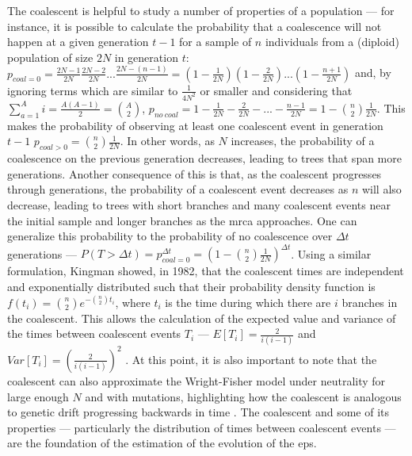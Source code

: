 The coalescent is helpful to study a number of properties of a population --- for instance, it is possible to calculate the probability that a coalescence will not happen at a given generation $t-1$ for a sample of $n$ individuals from a (diploid) population of size $2N$ in generation $t$: $p_{coal=0} = \frac{2N-1}{2N}\frac{2N-2}{2N}...\frac{2N-(n-1)}{2N} = (1 - \frac{1}{2N})(1 - \frac{2}{2N})...(1 - \frac{n+1}{2N})$ and, by ignoring terms which are similar to $\frac{1}{4N^2}$ or smaller and considering that $\sum^A_{a=1}{i} = \frac{A(A-1)}{2} = \binom{A}{2}$, $p_{no\ coal} = 1 - \frac{1}{2N} - \frac{2}{2N} -...- \frac{n-1}{2N} = 1 - \binom{n}{2}\frac{1}{2N}$. This makes the probability of observing at least one coalescent event in generation $t-1$ $p_{coal>0} = \binom{n}{2}\frac{1}{2N}$. In other words, as $N$ increases, the probability of a coalescence on the previous generation decreases, leading to trees that span more generations. Another consequence of this is that, as the coalescent progresses through generations, the probability of a coalescent event decreases as $n$ will also decrease, leading to trees with short branches and many coalescent events near the initial sample and longer branches as the \ac{mrca} approaches. One can generalize this probability to the probability of no coalescence over $\Delta t$ generations --- $P(T > \Delta t) = p_{coal=0}^{\Delta t} = (1-\binom{n}{2}\frac{1}{2N})^{\Delta t}$. Using a similar formulation, Kingman showed, in 1982, that the coalescent times are independent and exponentially distributed such that their probability density function is $f(t_i) = \binom{n}{2}e^{-\binom{n}{2}t_i}$, where $t_i$ is the time during which there are $i$ branches in the coalescent. This allows the calculation of the expected value and variance of the times between coalescent events $T_i$ --- $E[T_i] = \frac{2}{i(i-1)}$ and $Var[T_i] = (\frac{2}{i(i-1)})^2$ \cite{Kingman1982-tc}. At this point, it is also important to note that the coalescent can also approximate the Wright-Fisher model under neutrality for large enough $N$ and with mutations, highlighting how the coalescent is analogous to genetic drift progressing backwards in time \cite{Wakeley2008-wh}. The coalescent and some of its properties --- particularly the distribution of times between coalescent events --- are the foundation of the estimation of the evolution of the \ac{eps}.

